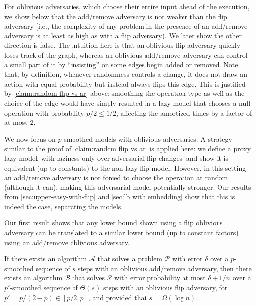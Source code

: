 \documentclass[letter,11pt]{article}
\newcommand{\alg}[1]{{\mathcal{#1}}}
\begin{document}
For oblivious adversaries, which choose their entire input ahead of the execution, we show below that the add/remove adversary is not weaker than the flip adversary 
(i.e., the complexity of any problem in the presence of an add/remove adversary is at least as high as with a flip adversary).
We later show the other direction is false. 
The intuition here
is that an oblivious flip adversary 
quickly loses track of the graph, whereas an oblivious add/remove adversary can control a small part of it by ``insisting'' on some edges begin added or removed.
Note that, by definition, whenever randomness controls a change, it does not draw an action with equal probability but instead always flips this edge. 
This is justified by \cref{claim:random flip vs ar} above: 
smoothing the operation type 
as well as the choice of the edge would have simply resulted in a lazy model that chooses a null operation with probability $p/2 \leq 1/2$, affecting the amortized times by a factor of at most $2$.

We now focus on $p$-smoothed models with oblivious adversaries. 
A strategy similar to the proof of \cref{claim:random flip vs ar} is applied here: 
we define a proxy lazy model, with laziness only over adversarial flip changes, 
and show it is equivalent (up to constants) to the non-lazy flip model.
However, in this setting an add/remove adversary is not forced to choose the operation at random (although it can), making this adversarial model potentially stronger. 
Our results from \cref{sec:upper-easy-with-flip} and \cref{sec:lb with embedding} show that this is indeed the case, separating the models.

Our first result shows that any lower bound shown using a flip oblivious adversary can be translated to a similar lower bound (up to constant factors) using an add/remove oblivious adversary.

\begin{claim}
	\label{claim:oblivious ar vs flip}
    If there exists an algorithm $\alg{A}$ that solves a problem $\mathcal{P}$ with error $\delta$ over a $p$-smoothed sequence of $s$ steps with an oblivious add/remove adversary,
    then there exists an algorithm $\alg{B}$ that solves $\mathcal{P}$ with error probability at most $\delta + 1/n$ over a $p'$-smoothed sequence of $\Theta(s)$ steps with an oblivious flip adversary, for $p'= p/(2-p) \in [p/2,p]$, and provided that $s = \Omega(\log n)$.
\end{claim}
\end{document}
